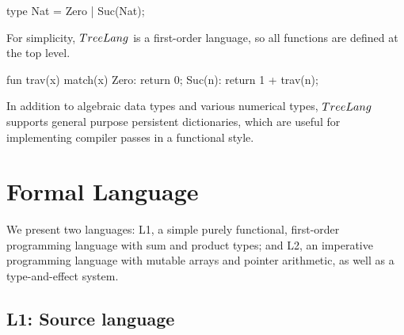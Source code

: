 \documentclass[preprint,10pt,nocopyrightspace,nonatbib]{./bibs/sigplanconf}
\begin{document}

\begin{code}[language=haskell]
type Nat = Zero | Suc(Nat);
\end{code}

For simplicity, $TreeLang{}$ is a first-order language, so all
functions are defined at the top level.

\begin{code}[language=haskell]
fun trav(x) {
  match(x) {
    Zero: return 0;
    Suc(n): return 1 + trav(n);
}}
\end{code}

In addition to algebraic data types and various numerical types, $TreeLang{}$ supports
general purpose persistent dictionaries, which are useful for implementing compiler
passes in a functional style.



\section{Formal Language}



We present two languages: L1, a simple purely functional, first-order programming
language with sum and product types; and L2, an imperative programming language
with mutable arrays and pointer arithmetic, as well as a type-and-effect system.

\subsection{L1: Source language}


\end{document}
